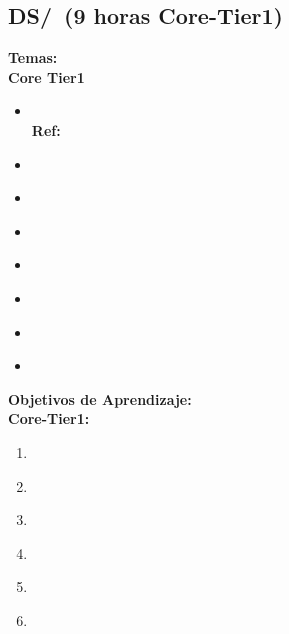 \subsection{DS/\DSBasicLogic~(9 horas Core-Tier1)}\label{sec:BOK:DSBasicLogic}
\noindent \textbf{Temas:}\\
\noindent \textbf{Core Tier1}
\begin{itemize}
	\item \DSBasicLogicTopicPropositional\xspace \\ \textbf{Ref:} \label{sec:BOK:DSBasicLogicTopicPropositional}
	\item \DSBasicLogicTopicLogical\label{sec:BOK:DSBasicLogicTopicLogical}
	\item \DSBasicLogicTopicTruth\label{sec:BOK:DSBasicLogicTopicTruth}
	\item \DSBasicLogicTopicNormal\label{sec:BOK:DSBasicLogicTopicNormal}
	\item \DSBasicLogicTopicValidity\label{sec:BOK:DSBasicLogicTopicValidity}
	\item \DSBasicLogicTopicPropositionalInference\label{sec:BOK:DSBasicLogicTopicPropositionalInference}
	\item \DSBasicLogicTopicPredicate\label{sec:BOK:DSBasicLogicTopicPredicate}
	\item \DSBasicLogicTopicLimitations\label{sec:BOK:DSBasicLogicTopicLimitations}
\end{itemize}


\noindent \textbf{Objetivos de Aprendizaje:}\\
\noindent \textbf{Core-Tier1:}
\begin{enumerate}
	\setcounter{enumi}{0}
	\item \DSBasicLogicLOConvertLogical\xspace[\DSBasicLogicLOConvertLogicalLevel]\label{sec:BOK:DSBasicLogicLOConvertLogical}
	\item \DSBasicLogicLOApplyFormal\xspace[\DSBasicLogicLOApplyFormalLevel]\label{sec:BOK:DSBasicLogicLOApplyFormal}
	\item \DSBasicLogicLOUseThe\xspace[\DSBasicLogicLOUseTheLevel]\label{sec:BOK:DSBasicLogicLOUseThe}
	\item \DSBasicLogicLODescribeHowCan\xspace[\DSBasicLogicLODescribeHowCanLevel]\label{sec:BOK:DSBasicLogicLODescribeHowCan}
	\item \DSBasicLogicLOApplyFormalAnd\xspace[\DSBasicLogicLOApplyFormalAndLevel]\label{sec:BOK:DSBasicLogicLOApplyFormalAnd}
	\item \DSBasicLogicLODescribeTheLimitationsAnd\xspace[\DSBasicLogicLODescribeTheLimitationsAndLevel]\label{sec:BOK:DSBasicLogicLODescribeTheLimitationsAnd}
\end{enumerate}


